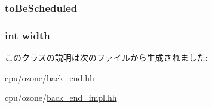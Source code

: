 \label{classBackEnd_1_1InstQueue_a439227feff9d7f55384e8780cfc2eb82}
\hypertarget{classBackEnd_1_1InstQueue_ad2696412af240d7ad2a5f9a4bf3157ef}{
\subsubsection[{toBeScheduled}]{ {\bf toBeScheduled}}}
\label{classBackEnd_1_1InstQueue_ad2696412af240d7ad2a5f9a4bf3157ef}
\hypertarget{classBackEnd_1_1InstQueue_a2474a5474cbff19523a51eb1de01cda4}{
\subsubsection[{width}]{\setlength{\rightskip}{0pt plus 5cm}int {\bf width}}}
\label{classBackEnd_1_1InstQueue_a2474a5474cbff19523a51eb1de01cda4}


このクラスの説明は次のファイルから生成されました:\begin{DoxyCompactItemize}
\item 
cpu/ozone/\hyperlink{back__end_8hh}{back\_\-end.hh}\item 
cpu/ozone/\hyperlink{back__end__impl_8hh}{back\_\-end\_\-impl.hh}\end{DoxyCompactItemize}

